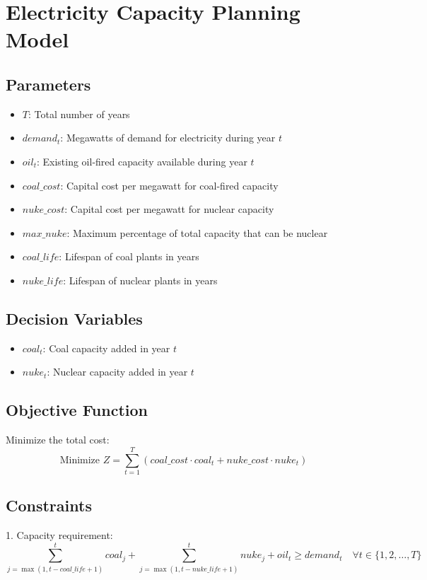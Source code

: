 \documentclass{article}
\begin{document}
\section*{Electricity Capacity Planning Model}

\subsection*{Parameters}
\begin{itemize}
    \item $T$: Total number of years
    \item $demand_t$: Megawatts of demand for electricity during year $t$
    \item $oil_t$: Existing oil-fired capacity available during year $t$
    \item $coal\_cost$: Capital cost per megawatt for coal-fired capacity
    \item $nuke\_cost$: Capital cost per megawatt for nuclear capacity
    \item $max\_nuke$: Maximum percentage of total capacity that can be nuclear
    \item $coal\_life$: Lifespan of coal plants in years
    \item $nuke\_life$: Lifespan of nuclear plants in years
\end{itemize}

\subsection*{Decision Variables}
\begin{itemize}
    \item $coal_t$: Coal capacity added in year $t$
    \item $nuke_t$: Nuclear capacity added in year $t$
\end{itemize}

\subsection*{Objective Function}
Minimize the total cost:
\[
\text{Minimize } Z = \sum_{t=1}^{T} (coal\_cost \cdot coal_t + nuke\_cost \cdot nuke_t)
\]

\subsection*{Constraints}
1. Capacity requirement:
\[
\sum_{j=\max(1, t - coal\_life + 1)}^{t} coal_j + \sum_{j=\max(1, t - nuke\_life + 1)}^{t} nuke_j + oil_t \geq demand_t \quad \forall t \in \{1, 2, \ldots, T\}
\]
\end{document}
